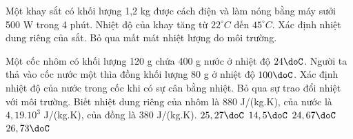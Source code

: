 \begin{vidu}
	Một khay sắt có khối lượng 1,2 kg được cách điện và làm nóng bằng máy sưởi 500 W trong 4 phút. Nhiệt độ của khay tăng từ $22^\circ C$ đến $45^\circ C$. Xác định nhiệt dung riêng của sắt. Bỏ qua mất mát nhiệt lượng do môi trường.
	\loigiai{
		\begin{itemize}
			\item 
			\item 
			\item 
			\item 
			\item 
			\item 
		\end{itemize}
	}
\end{vidu}

\begin{vidu}%
	Một cốc nhôm có khối lượng 120 g chứa 400 g nước ở nhiệt độ $24\doC$. Người ta thả vào cốc nước một thìa đồng khối lượng 80 g ở nhiệt độ $100\doC$. Xác định nhiệt độ của nước trong cốc khi có sự cân bằng nhiệt.  Bỏ qua sự trao đổi nhiệt với môi trường. Biết nhiệt dung riêng của nhôm là 880 J/(kg.K), của nước là $4,19.10^3$ J/(kg.K), của đồng là 380 J/(kg.K).
	\choice
	{\True $25,27\doC$}
	{$14,5\doC$}
	{$24,67\doC$}
	{$26,73\doC$}
\end{vidu}
